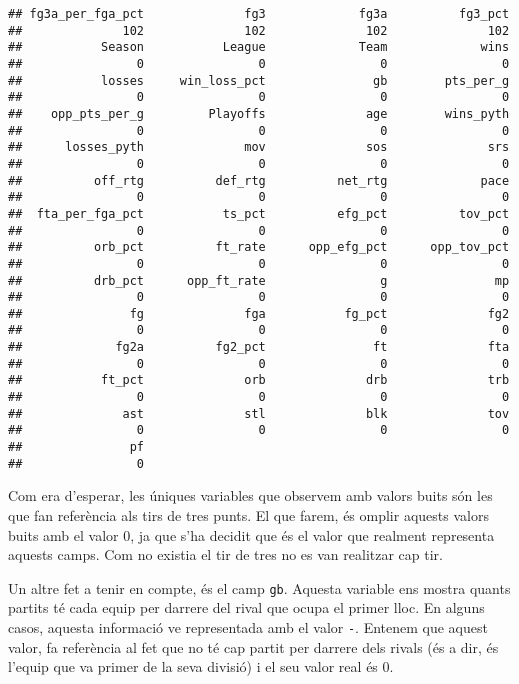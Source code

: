 \documentclass[
]{article}
\begin{document}
\begin{verbatim}
## fg3a_per_fga_pct              fg3             fg3a          fg3_pct 
##              102              102              102              102 
##           Season           League             Team             wins 
##                0                0                0                0 
##           losses     win_loss_pct               gb        pts_per_g 
##                0                0                0                0 
##    opp_pts_per_g         Playoffs              age        wins_pyth 
##                0                0                0                0 
##      losses_pyth              mov              sos              srs 
##                0                0                0                0 
##          off_rtg          def_rtg          net_rtg             pace 
##                0                0                0                0 
##  fta_per_fga_pct           ts_pct          efg_pct          tov_pct 
##                0                0                0                0 
##          orb_pct          ft_rate      opp_efg_pct      opp_tov_pct 
##                0                0                0                0 
##          drb_pct      opp_ft_rate                g               mp 
##                0                0                0                0 
##               fg              fga           fg_pct              fg2 
##                0                0                0                0 
##             fg2a          fg2_pct               ft              fta 
##                0                0                0                0 
##           ft_pct              orb              drb              trb 
##                0                0                0                0 
##              ast              stl              blk              tov 
##                0                0                0                0 
##               pf 
##                0
\end{verbatim}

Com era d'esperar, les úniques variables que observem amb valors buits
són les que fan referència als tirs de tres punts. El que farem, és
omplir aquests valors buits amb el valor 0, ja que s'ha decidit que és
el valor que realment representa aquests camps. Com no existia el tir de
tres no es van realitzar cap tir.

Un altre fet a tenir en compte, és el camp \texttt{gb}. Aquesta variable
ens mostra quants partits té cada equip per darrere del rival que ocupa
el primer lloc. En alguns casos, aquesta informació ve representada amb
el valor \texttt{-}. Entenem que aquest valor, fa referència al fet que
no té cap partit per darrere dels rivals (és a dir, és l'equip que va
primer de la seva divisió) i el seu valor real és 0.
\end{document}

